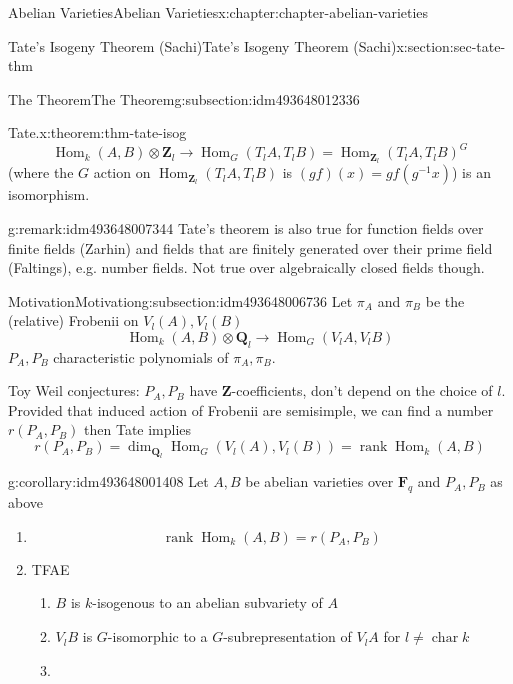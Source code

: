 \documentclass[oneside,10pt,]{book}
\numberwithin{equation}{section}
\newcommand{\ZZ}{\mathbf{Z}}
\newcommand{\QQ}{\mathbf{Q}}
\newcommand{\FF}{\mathbf{F}}
\DeclareMathOperator{\Hom}{Hom}
\DeclareMathOperator{\rank}{rank}
\DeclareMathOperator{\characteristic}{char}
\begin{document}
\begin{chapterptx}{Abelian Varieties}{}{Abelian Varieties}{}{}{x:chapter:chapter-abelian-varieties}
\begin{sectionptx}{Tate's Isogeny Theorem (Sachi)}{}{Tate's Isogeny Theorem (Sachi)}{}{}{x:section:sec-tate-thm}
\begin{subsectionptx}{The Theorem}{}{The Theorem}{}{}{g:subsection:idm493648012336}
\begin{theorem}{Tate.}{}{x:theorem:thm-tate-isog}
\begin{equation*}
\Hom_{k}(A,B)\otimes \ZZ_l \to \Hom_G(T_l A, T_lB) = \Hom_{\ZZ_l}(T_lA,T_lB)^G
\end{equation*}
(where the \(G\) action on \(\Hom_{\ZZ_l}(T_l A, T_lB)\) is \((gf)(x) = gf(g^{-1}x)\)) is an isomorphism.%
\end{theorem}
\begin{remark}{}{g:remark:idm493648007344}%
Tate's theorem is also true for function fields over finite fields (Zarhin) and fields that are finitely generated over their prime field (Faltings), e.g. number fields. Not true over algebraically closed fields though.%
\end{remark}
\end{subsectionptx}
%
%
\typeout{************************************************}
\typeout{************************************************}
%
\begin{subsectionptx}{Motivation}{}{Motivation}{}{}{g:subsection:idm493648006736}
Let \(\pi_A\) and \(\pi_B\) be the (relative) Frobenii on \(V_l(A), V_l(B)\)%
\begin{equation*}
\Hom_{k}(A,B)\otimes \QQ_l \to \Hom_G(V_l A, V_lB)
\end{equation*}
\(P_A,P_B\) characteristic polynomials of \(\pi_A,\pi_B\).%
\par
Toy Weil conjectures: \(P_A, P_B\) have \(\ZZ\)-coefficients, don't depend on the choice of \(l\). Provided that induced action of Frobenii are semisimple, we can find a number \(r(P_A,P_B)\) then Tate implies%
\begin{equation*}
r(P_A,P_B) = \dim_{\QQ_l} \Hom_G (V_l(A), V_l(B)) = \rank \Hom_k(A,B)
\end{equation*}
%
\begin{corollary}{}{}{g:corollary:idm493648001408}%
Let \(A, B\) be abelian varieties over \(\FF_q\) and \(P_A, P_B\) as above%
\begin{enumerate}
\item{}%
\begin{equation*}
\rank \Hom_k(A,B) = r(P_A,P_B)
\end{equation*}
%
\item{}TFAE%
\begin{enumerate}
\item{}\(B\) is \(k\)-isogenous to an abelian subvariety of \(A\)%
\item{}\(V_lB\) is \(G\)-isomorphic to a \(G\)-subrepresentation of \(V_lA\) for \(l \ne \characteristic k\)%
\item{}%

\end{enumerate}
\end{enumerate}
\end{corollary}
\end{subsectionptx}
\end{sectionptx}
\end{chapterptx}
\end{document}

